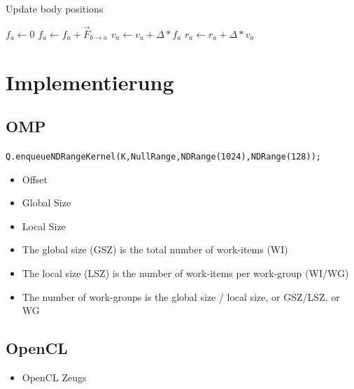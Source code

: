 \documentclass{beamer}
\begin{document}
\begin{frame}


\begin{algorithm}[H]
\caption{Update body positions}
\begin{algorithmic}[1]
      \State $f_a \gets 0$ 
        \State $f_a \gets f_a + \vec{F}^{\,}_{b\rightarrow a}$ 
      \EndFor
   \EndFor
      \State $v_a \gets v_a + \Delta * f_a$ 
      \State $r_a \gets r_a + \Delta * v_a$ 
   \EndFor
\EndProcedure
\end{algorithmic}
\end{algorithm}


\end{frame}

\section{Implementierung}

\subsection{OMP}
\begin{frame}

\small{\texttt{Q.enqueueNDRangeKernel(K,NullRange,NDRange(1024),NDRange(128));}}
\begin{itemize}
  \item Offset
  \item Global Size
  \item Local Size
  \item The global size (GSZ) is the total number of work-items (WI)
  \item The local size (LSZ) is the number of work-items per work-group (WI/WG)
  \item The number of work-groups is the global size / local size, or GSZ/LSZ, or WG
\end{itemize}
\end{frame}

\subsection{OpenCL}
\begin{frame}
\begin{itemize}
  \item OpenCL Zeugs
\end{itemize}
\end{frame}
\end{document}
